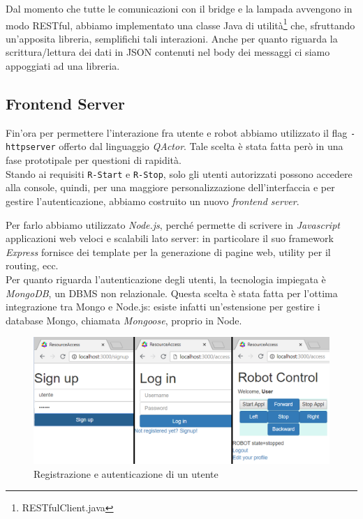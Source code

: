 \documentclass{../llncs}
\newcommand{\codescript}[1]{{\mbox{\small{\texttt{#1}}}}\xspace}
\newcommand{\code}[1]{{\color{blue}\small{\texttt{#1}}}}
\newcommand{\qa}{\textsf{\textit{QActor}}\xspace}
\newcommand{\labelssec}[1]{\label{ssec:#1}}
\begin{document}
Dal momento che tutte le comunicazioni con il bridge e la lampada avvengono in modo RESTful, abbiamo implementato una classe Java di utilità\footnote{RESTfulClient.java} che, sfruttando un'apposita libreria, semplifichi tali interazioni.
Anche per quanto riguarda la scrittura/lettura dei dati in JSON contenuti nel body dei messaggi ci siamo appoggiati ad una libreria.

\subsection{Frontend Server}
\labelssec{frontendImpl}
Fin'ora per permettere l'interazione fra utente e robot abbiamo utilizzato il flag \codescript{-httpserver} offerto dal linguaggio \qa. Tale scelta è stata fatta però in una fase prototipale per questioni di rapidità.\\

Stando ai requisiti \code{R-Start} e \code{R-Stop}, solo gli utenti autorizzati possono accedere alla console, quindi, per una maggiore personalizzazione dell'interfaccia e per gestire l'autenticazione, abbiamo costruito un nuovo \emph{frontend server}.

Per farlo abbiamo utilizzato \emph{Node.js}, perché permette di scrivere in \emph{Javascript} applicazioni web veloci e scalabili lato server: in particolare il suo framework \emph{Express} fornisce dei template per la generazione di pagine web, utility per il routing, ecc.\\

Per quanto riguarda l'autenticazione degli utenti, la tecnologia impiegata è \emph{MongoDB}, un DBMS non relazionale. Questa scelta è stata fatta per l'ottima integrazione tra Mongo e Node.js: esiste infatti un'estensione per gestire i database Mongo, chiamata \emph{Mongoose}, proprio in Node.\\

\begin{figure}
\centering
\includegraphics[scale=0.4]{img/screenFrontend/screenCollage.PNG}
\caption{Registrazione e autenticazione di un utente}
\end{figure}
\end{document}
